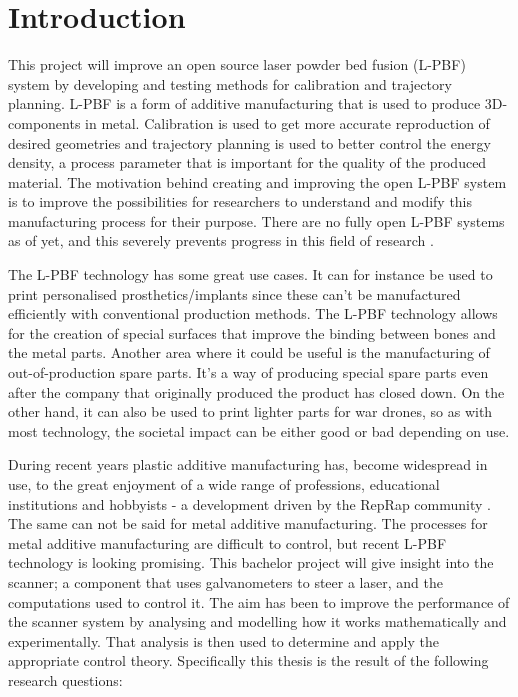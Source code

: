 \chapter{Introduction}

This project will improve an open source laser powder bed fusion (L-PBF) system by developing and testing methods for calibration and trajectory planning. L-PBF is a form of additive manufacturing that is used to produce 3D-components in metal. Calibration is used to get more accurate reproduction of desired geometries and trajectory planning is used to better control the energy density, a process parameter that is important for the quality of the produced material. The motivation behind creating and improving the open L-PBF system is to improve the possibilities for researchers to understand and modify this manufacturing process for their purpose. There are no fully open L-PBF systems as of yet, and this severely prevents progress in this field of research \cite[Section 1.4]{sebastian-phd}. 

The L-PBF technology has some great use cases. It can for instance be used to print personalised prosthetics/implants since these can't be manufactured efficiently with conventional production methods. The L-PBF technology allows for the creation of special surfaces that improve the binding between bones and the metal parts. Another area where it could be useful is the manufacturing of out-of-production spare parts. It's a way of producing special spare parts even after the company that originally produced the product has closed down. On the other hand, it can also be used to print lighter parts for war drones, so as with most technology, the societal impact can be either good or bad depending on use.

During recent years plastic additive manufacturing has, become widespread in use, to the great enjoyment of a wide range of professions, educational institutions and hobbyists - a development driven by the RepRap community \cite{reprap}. The same can not be said for metal additive manufacturing. The processes for metal additive manufacturing are difficult to control, but recent L-PBF technology is looking promising. This bachelor project will give insight into the scanner; a component that uses galvanometers to steer a laser, and the computations used to control it. The aim has been to improve the performance of the scanner system by analysing and modelling how it works mathematically and experimentally. That analysis is then used to determine and apply the appropriate control theory. Specifically this thesis is the result of the following research questions:

